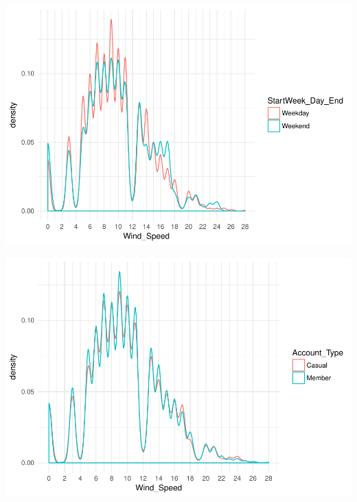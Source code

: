 \documentclass[]{article}
\newenvironment{Shaded}{\begin{snugshade}}{\end{snugshade}}
\newcommand{\KeywordTok}[1]{\textcolor[rgb]{0.13,0.29,0.53}{\textbf{#1}}}
\newcommand{\DataTypeTok}[1]{\textcolor[rgb]{0.13,0.29,0.53}{#1}}
\newcommand{\DecValTok}[1]{\textcolor[rgb]{0.00,0.00,0.81}{#1}}
\newcommand{\StringTok}[1]{\textcolor[rgb]{0.31,0.60,0.02}{#1}}
\newcommand{\CommentTok}[1]{\textcolor[rgb]{0.56,0.35,0.01}{\textit{#1}}}
\newcommand{\OperatorTok}[1]{\textcolor[rgb]{0.81,0.36,0.00}{\textbf{#1}}}
\newcommand{\NormalTok}[1]{#1}
\begin{document}
\includegraphics{Nice_Ride_Project_Stat_ReportDRAFT_files/figure-latex/unnamed-chunk-14-1.pdf}

\begin{Shaded}
\end{Shaded}

\includegraphics{Nice_Ride_Project_Stat_ReportDRAFT_files/figure-latex/unnamed-chunk-14-2.pdf}
\end{document}
